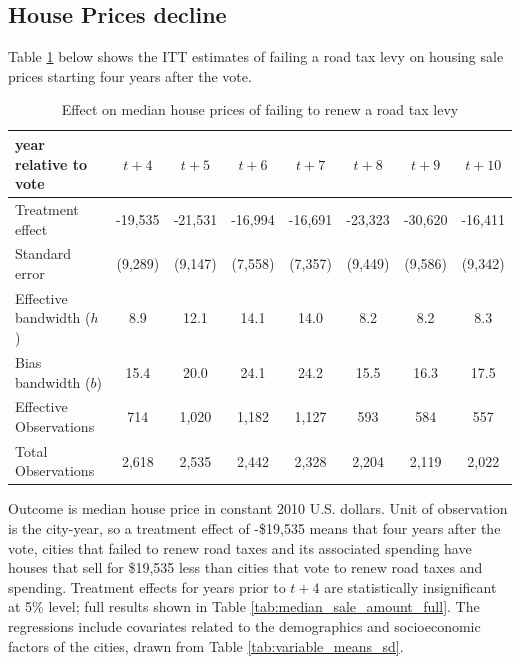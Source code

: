 \subsection{House Prices decline}

 Table \ref{tab:median_sale_amount} below shows the ITT estimates of failing a road tax levy on housing sale prices starting four years after the vote. 

\begin{table}[ht]
    \centering
    \caption{Effect on median house prices of failing to renew a road tax levy}
    \label{tab:median_sale_amount}
    \begin{tabular}{p{2cm}ccccccc}
        \hline
        year relative to vote & $t + 4$ & $t + 5$ & $t + 6$ & $t + 7$ & $t + 8$ & $t + 9$ & $t + 10$ \\
        \hline
        Treatment effect & -19,535 & -21,531 & -16,994 & -16,691 & -23,323 & -30,620 & -16,411 \\
        Standard error & (9,289) & (9,147) & (7,558) & (7,357) & (9,449) & (9,586) & (9,342) \\
        Effective bandwidth ($h$) & 8.9 & 12.1 & 14.1 & 14.0 & 8.2 & 8.2 & 8.3 \\
        Bias bandwidth ($b$) & 15.4 & 20.0 & 24.1 & 24.2 & 15.5 & 16.3 & 17.5 \\
        Effective Observations & 714 & 1,020 & 1,182 & 1,127 & 593 & 584 & 557 \\
        Total Observations & 2,618 & 2,535 & 2,442 & 2,328 & 2,204 & 2,119 & 2,022 \\
        \hline
    \end{tabular}
    \begin{tablenotes}
        \small
        \item Outcome is median house price in constant 2010 U.S. dollars. Unit of observation is the city-year, so a treatment effect of -\$19,535 means that four years after the vote, cities that failed to renew road taxes and its associated spending have houses that sell for \$19,535 less than cities that vote to renew road taxes and spending. Treatment effects for years prior to $t + 4$ are statistically insignificant at 5\% level; full results shown in Table \ref{tab:median_sale_amount_full}. The regressions include covariates related to the demographics and socioeconomic factors of the cities, drawn from Table \ref{tab:variable_means_sd}.
    \end{tablenotes}
\end{table}

